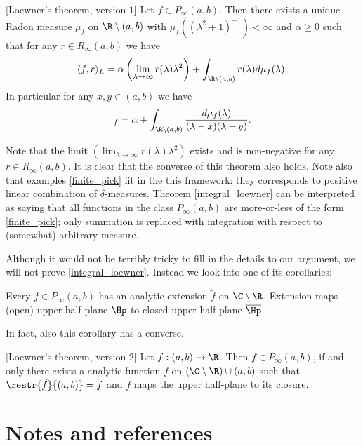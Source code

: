 \begin{lause}\label{integral_loewner}[Loewner's theorem, version $1$]
	Let $f \in P_{\infty}(a, b)$. Then there exists a unique Radon measure $\mu_{f}$ on $\R \setminus (a, b)$ with $\mu_{f}((\lambda^2 + 1)^{-1}) < \infty$ and $\alpha \geq 0$ such that for any $r \in R_{\infty}(a, b)$ we have
	\begin{align*}
		\langle f, r \rangle_{L} = \alpha \left(\lim_{\lambda \to \infty} r(\lambda) \lambda^2 \right) + \int_{\R \setminus (a, b)} r(\lambda) d \mu_{f}(\lambda).
	\end{align*}
	In particular for any $x,y \in (a, b)$ we have
	\begin{align*}
		[x, y]_{f} = \alpha + \int_{\R \setminus (a, b)} \frac{d \mu_{f}(\lambda)}{(\lambda - x) (\lambda - y)}.
	\end{align*}
\end{lause}

Note that the limit $\left(\lim_{\lambda \to \infty} r(\lambda) \lambda^2 \right)$ exists and is non-negative for any $r \in R_{\infty}(a, b)$. It is clear that the converse of this theorem also holds. Note also that examples \ref{finite_pick} fit in the this framework: they corresponds to positive linear combination of $\delta$-measures. Theorem \ref{integral_loewner} can be interpreted as saying that all functions in the class $P_{\infty}(a, b)$ are more-or-less of the form \ref{finite_pick}; only summation is replaced with integration with respect to (somewhat) arbitrary measure.

Although it would not be terribly tricky to fill in the details to our argument, we will not prove \ref{integral_loewner}. Instead we look into one of its corollaries:

\begin{kor}
	Every $f \in P_{\infty}(a, b)$ has an analytic extension $\tilde{f}$ on $\C \setminus \R$. Extension maps (open) upper half-plane $\Hp$ to closed upper half-plane $\overline{\Hp}$.
\end{kor}

In fact, also this corollary has a converse.

\begin{lause}\label{weak_loewner}[Loewner's theorem, version $2$]
	Let $f : (a, b) \to \R$. Then $f \in P_{\infty}(a, b)$, if and only there exists a analytic function $\tilde{f}$ on $(\C \setminus \R) \cup (a, b)$ such that $\restr{\tilde{f}}{(a, b)} = f$ and $\tilde{f}$ maps the upper half-plane to its closure.
\end{lause}

\section{Notes and references}
